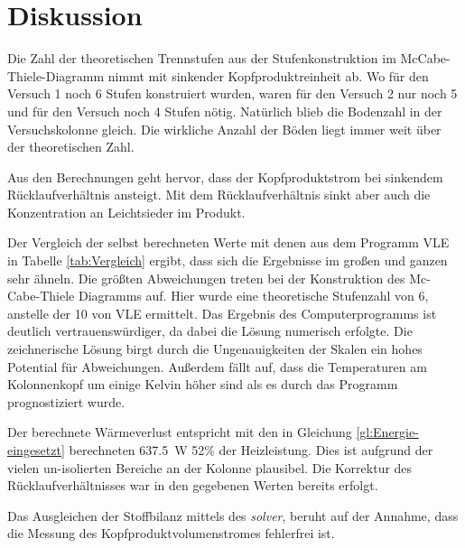 \newpage
\section{Diskussion}
\label{sec:diskussion}

Die Zahl der theoretischen Trennstufen aus der Stufenkonstruktion im McCabe-Thiele-Diagramm nimmt mit sinkender Kopfproduktreinheit ab. Wo für den Versuch 1 noch 6 Stufen konstruiert wurden, waren für den Versuch 2 nur noch 5 und für den Versuch noch 4 Stufen nötig. Natürlich blieb die Bodenzahl in der Versuchskolonne gleich. Die wirkliche Anzahl der Böden liegt immer weit über der theoretischen Zahl.

Aus den Berechnungen geht hervor, dass der Kopfproduktstrom bei sinkendem Rücklaufverhältnis ansteigt. Mit dem Rücklaufverhältnis sinkt aber auch die Konzentration an Leichtsieder im Produkt.

Der Vergleich der selbst berechneten Werte mit denen aus dem Programm VLE in Tabelle \ref{tab:Vergleich} ergibt, dass sich die Ergebnisse im großen und ganzen sehr ähneln. Die größten Abweichungen treten bei der Konstruktion des Mc-Cabe-Thiele Diagramms auf. Hier wurde eine theoretische Stufenzahl von 6, anstelle der 10 von VLE ermittelt. Das Ergebnis des Computerprogramms ist deutlich vertrauenswürdiger, da dabei die Lösung numerisch erfolgte. Die zeichnerische Lösung birgt durch die Ungenauigkeiten der Skalen ein hohes Potential für Abweichungen. Außerdem fällt auf, dass die Temperaturen am Kolonnenkopf um einige Kelvin höher sind als es durch das Programm prognostiziert wurde.

Der berechnete Wärmeverlust entspricht mit den in Gleichung \eqref{gl:Energie-eingesetzt} berechneten \SI{637,5}{\watt} 52\% der Heizleistung. Dies ist aufgrund der vielen un-isolierten Bereiche an der Kolonne plausibel. Die Korrektur des Rücklaufverhältnisses war in den gegebenen Werten bereits erfolgt.

Das Ausgleichen der Stoffbilanz mittels des \emph{solver}, beruht auf der Annahme, dass die Messung des Kopfproduktvolumenstromes fehlerfrei ist.

